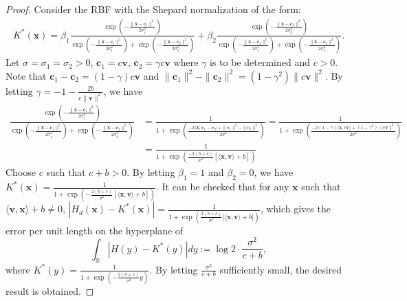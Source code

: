 \documentclass[final,1p,times]{elsarticle}
\theoremstyle{plain}
\theoremstyle{definition}
\theoremstyle{remark}
\newcommand{\bx}{\mathbf{x}}
\newcommand{\bv}{\mathbf{v}}
\newcommand{\bc}{\mathbf{c}}
\begin{document}
\begin{proof}
    Consider the RBF with the Shepard normalization of the form:
    \begin{align*}
        K^*(\bx) = \beta_1 \frac{\exp(-\frac{\|\bx-\bc_1\|^2}{2\sigma_1^2})}{\exp(-\frac{\|\bx-\bc_1\|^2}{2\sigma_1^2})+\exp(-\frac{\|\bx-\bc_2\|^2}{2\sigma_2^2})}
        + \beta_2 \frac{\exp(-\frac{\|\bx-\bc_2\|^2}{2\sigma_2^2})}{\exp(-\frac{\|\bx-\bc_1\|^2}{2\sigma_1^2})+\exp(-\frac{\|\bx-\bc_2\|^2}{2\sigma_2^2})}.
    \end{align*}
    Let $\sigma=\sigma_1=\sigma_2>0$, $\bc_1=c\bv$, $\bc_2 = \gamma c\bv$
    where $\gamma$ is to be determined and $c > 0$.
    Note that $\bc_1-\bc_2 = (1-\gamma)c\bv$ and
    $
    \|\bc_1\|^2-\|\bc_2\|^2 = (1-\gamma^2)\|c\bv\|^2.
    $
    By letting $\gamma = -1-\frac{2b}{c\|\bv\|^2}$, we have
    \begin{align*}
        \frac{\exp(-\frac{\|\bx-\bc_1\|^2}{2\sigma_1^2})}{\exp(-\frac{\|\bx-\bc_1\|^2}{2\sigma_1^2})+\exp(-\frac{\|\bx-\bc_2\|^2}{2\sigma_2^2})}
        &= \frac{1}{1 + \exp(\frac{-2\langle \bx, \bc_1-\bc_2 \rangle + \|\bc_1\|^2-\|\bc_2\|^2}{2\sigma^2})}
        = \frac{1}{1 + \exp(\frac{-2(1-\gamma)\langle \bx, c\bv \rangle + (1-\gamma^2)\|c\bv\|^2}{2\sigma^2})}
        \\
        &=\frac{1}{1 + \exp(\frac{-2(b+c)}{\sigma^2}\left[\langle \bx, \bv \rangle +b\right])}
    \end{align*}
    Choose $c$ such that $c + b > 0$.
    By letting $\beta_1 = 1$ and $\beta_2 = 0$, 
    we have $K^*(\bx) = \frac{1}{1 + \exp(-\frac{2(b+c)}{\sigma^2}\left[\langle \bx, \bv \rangle +b\right])}$.
    It can be checked that for any $\bx$ such that $\langle \bv, \bx \rangle + b\ne 0$, 
    $|H_d(\bx)-K^*(\bx)|= \frac{1}{1 + \exp(\frac{2(b+c)}{\sigma^2}|\langle \bx, \bv \rangle +b|)}$, which gives
    the error per unit length on the hyperplane of
    \begin{equation}\label{eq:analytic_formula}
    \int_{\mathbb{R}} |H(y) - K^*(y)| dy := \log 2 \cdot \frac{\sigma^2}{c+b},
    \end{equation}
    where $K^*(y) = \frac{1}{1 + \exp(-\frac{2(b+c)}{\sigma^2}y)}$.
    By letting $\frac{\sigma^2}{c+b}$ sufficiently small, the desired result is obtained.
\end{proof}
\end{document}
